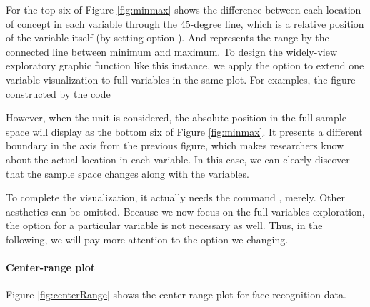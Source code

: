 \documentclass[article]{jss}
\begin{document}
For the top six of Figure \ref{fig:minmax} shows the difference between each location of concept in each variable through the 45-degree line, which is a relative position of the variable itself (by setting option ). And represents the range by the connected line between minimum and maximum. To design the widely-view exploratory graphic function like this instance, we apply the option  to extend one variable visualization to full variables in the same plot. For examples, the figure constructed by the code





However, when the unit is considered, the absolute position in the full sample space will display as the bottom six of Figure \ref{fig:minmax}. It presents a different boundary in the axis from the previous figure, which makes researchers know about the actual location in each variable. In this case, we can clearly discover that the sample space changes along with the variables.

To complete the visualization, it actually needs the command , merely. Other aesthetics can be omitted. Because we now focus on the full variables exploration, the  option for a particular variable is not necessary as well. Thus, in the following, we will pay more attention to the option we changing.




\paragraph{Center-range plot}
Figure \ref{fig:centerRange} shows the center-range plot for face recognition data.
\begin{CodeChunk}
\end{CodeChunk}
\end{document}
